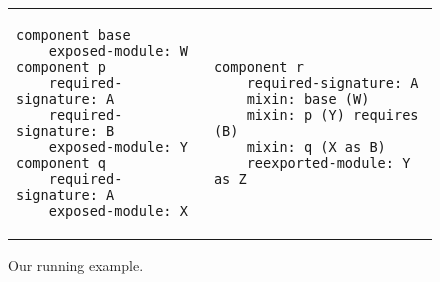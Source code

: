 \begin{figure}
\begin{tabular}{p{} p{}}
\begin{verbatim}
component base
    exposed-module: W
component p
    required-signature: A
    required-signature: B
    exposed-module: Y
component q
    required-signature: A
    exposed-module: X
\end{verbatim}
&
\begin{verbatim}
component r
    required-signature: A
    mixin: base (W)
    mixin: p (Y) requires (B)
    mixin: q (X as B)
    reexported-module: Y as Z
\end{verbatim}
\end{tabular}
  \caption{Our running example.}\label{fig:resolved-example}
\end{figure}

